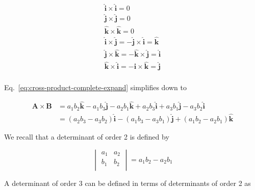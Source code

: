 \begin{align}
    \boldsymbol{\hat{i}} \times \boldsymbol{\hat{i}} = 0 \\
    \boldsymbol{\hat{j}} \times \boldsymbol{\hat{j}} = 0 \\
    \boldsymbol{\hat{k}} \times \boldsymbol{\hat{k}} = 0 \\
    \boldsymbol{\hat{i}} \times \boldsymbol{\hat{j}} = -\boldsymbol{\hat{j}} \times \boldsymbol{\hat{i}} = \boldsymbol{\hat{k}} \\
    \boldsymbol{\hat{j}} \times \boldsymbol{\hat{k}} = -\boldsymbol{\hat{k}} \times \boldsymbol{\hat{j}} = \boldsymbol{\hat{i}} \\
    \boldsymbol{\hat{k}} \times \boldsymbol{\hat{i}} = -\boldsymbol{\hat{i}} \times \boldsymbol{\hat{k}} = \boldsymbol{\hat{j}} \\
\end{align}

Eq.~\ref{eq:cross-product-complete-expand} simplifies down to

\begin{align}
    \boldsymbol{A} \times \boldsymbol{B} &= a_1 b_2 \boldsymbol{\hat{k}} - a_1 b_3 \boldsymbol{\hat{j}} - a_2 b_1 \boldsymbol{\hat{k}} + a_2 b_3 \boldsymbol{\hat{i}} + a_3 b_1 \boldsymbol{\hat{j}} - a_3 b_2 \boldsymbol{\hat{i}} \\
    &= (a_2 b_3 - a_3 b_2)\boldsymbol{\hat{i}} - (a_1 b_3 - a_3 b_1)\boldsymbol{\hat{j}} + (a_1 b_2 - a_2 b_1)\boldsymbol{\hat{k}}\label{eq:cross-product-algebraic-expand}
\end{align}

We recall that a determinant of order 2 is defined by

\begin{equation}
    \begin{vmatrix}
        a_1 & a_2 \\
        b_1 & b_2 \\
    \end{vmatrix} = a_1 b_2 - a_2 b_1
\end{equation}

A determinant of order 3 can be defined in terms of determinants of order 2 as

